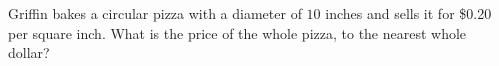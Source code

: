 Griffin bakes a circular pizza with a diameter of $10$ inches and sells it for \$0.20 per square inch. What is the price of the whole pizza, to the nearest whole dollar?
